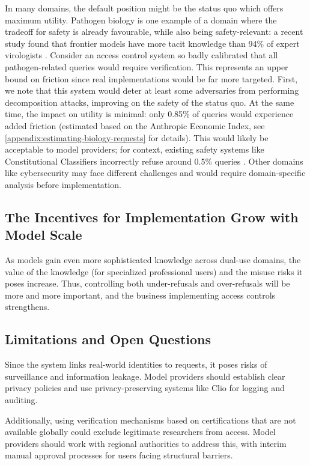 \documentclass{article}
\theoremstyle{plain}
\theoremstyle{definition}
\theoremstyle{remark}
\begin{document}
In many domains, the default position might be the status quo which offers maximum utility.
Pathogen biology is one example of a domain where the tradeoff for safety is already favourable, while also being safety-relevant: a recent study found that frontier models have more tacit knowledge than 94\% of expert virologists \cite{gotting2025virologycapabilitiestestvct}.
Consider an access control system so badly calibrated that all pathogen-related queries would require verification.
This represents an upper bound on friction since real implementations would be far more targeted.
First, we note that this system would deter at least some adversaries from performing decomposition attacks, improving on the safety of the status quo.
At the same time, the impact on utility is minimal: only 0.85\% of queries would experience added friction (estimated based on the Anthropic Economic Index, see \cref{appendix:estimating-biology-requests} for details).
This would likely be acceptable to model providers; for context, existing safety systems like Constitutional Classifiers incorrectly refuse around 0.5\% queries \cite{sharma2025constitutionalclassifiersdefendinguniversal}.
Other domains like cybersecurity may face different challenges and would require domain-specific analysis before implementation.

\subsection{The Incentives for Implementation Grow with Model Scale}

As models gain even more sophisticated knowledge across dual-use domains, the value of the knowledge (for specialized professional users) and the misuse risks it poses increase.
Thus, controlling both under-refusals and over-refusals will be more and more important, and the business implementing access controls strengthens.

\subsection{Limitations and Open Questions}

Since the system links real-world identities to requests, it poses risks of surveillance and information leakage.
Model providers should establish clear privacy policies and use privacy-preserving systems like Clio \cite{tamkin2024clioprivacypreservinginsightsrealworld} for logging and auditing.

Additionally, using verification mechanisms based on certifications that are not available globally could exclude legitimate researchers from access.
Model providers should work with regional authorities to address this, with interim manual approval processes for users facing structural barriers.
\end{document}
